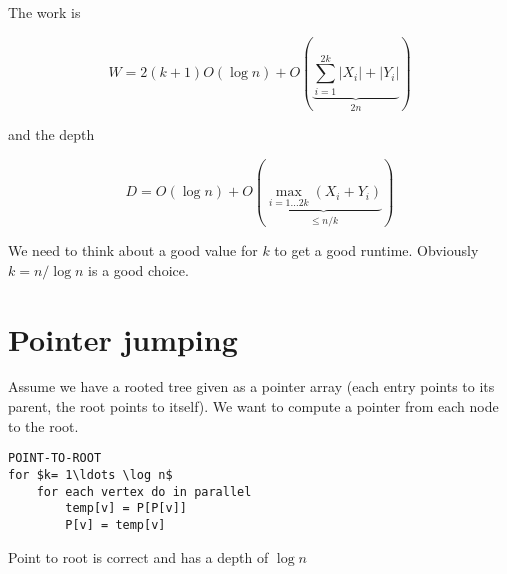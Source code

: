 The work is 

\[W=2(k+1)O(\log n) +  O(\underbrace{\sum_{i=1}^{2k} |X_i| + |Y_i|}_{2n})\]

and the depth 

\[D=O(\log n) +O(\underbrace{\max_{i=1\ldots 2k} (X_i+Y_i)}_{\leq n/k})\]

We need to think about a good value for $k$ to get a good runtime. Obviously $k= n/\log n$ is a good choice.

\section{Pointer jumping}

Assume we have a rooted tree given as a pointer array (each entry points to its parent, the root points to itself). We want to compute a pointer from each node to the root.

\begin{lstlisting}
POINT-TO-ROOT
for $k= 1\ldots \log n$ 
	for each vertex do in parallel
		temp[v] = P[P[v]]
		P[v] = temp[v]
\end{lstlisting}

\begin{thm} Point to root is correct and has a depth of $\log n$\end{thm}
